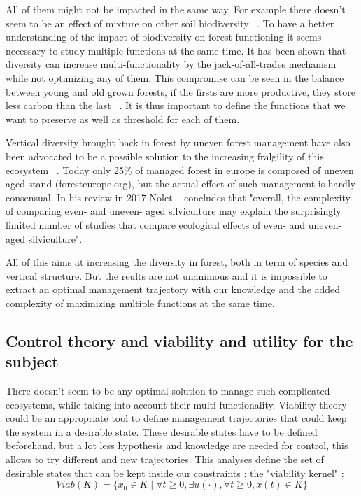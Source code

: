 \documentclass{article}
\begin{document}
All of them might not be impacted in the same way. For example there doesn't seem to be an effect of mixture on other soil biodiversity ~\autocite{korboulewskyHowTreeDiversity2016}.
To have a better understanding of the impact of biodiversity on forest functioning it seems necessary to study multiple functions at the same time. It has been shown that diversity can increase multi-functionality by the jack-of-all-trades mechanism ~\autocite{vanderplasJackofalltradesEffectsDrive2016} while not optimizing any of them. This compromise can be seen in the balance between young and old grown forests, if the firsts are more productive, they store less carbon than the last ~\autocite{caspersenSuccessionalDiversityForest2001}. It is thus important to define the functions that we want to preserve as well as threshold for each of them.

Vertical diversity brought back in forest by uneven forest management have also been advocated to be a possible solution to the increasing fralgility of this ecosystem ~\autocite{guldinRoleUnevenAgedSilviculture1996}. Today only 25\% of managed forest in europe is composed of uneven aged stand (foresteurope.org), but the actual effect of such management is hardly consensual. In his review in 2017 Nolet ~\autocite{noletComparingEffectsEven2018} concludes that "overall, the complexity	of comparing even- and uneven- aged silviculture may explain the surprisingly limited number of studies that compare ecological effects of even- and uneven- aged silviculture".

All of this aims at increasing the diversity in forest, both in term of species and vertical structure. But the reults are not unanimous and it is impossible to extract an optimal management trajectory with our knowledge and the added complexity of maximizing multiple functions at the same time.

\subsection{Control theory and viability and utility for the subject}

There doesn't seem to be any optimal solution to manage such complicated ecosystems, while taking into account their multi-functionality. Viability theory could be an appropriate tool to define management trajectories that could keep the system in a desirable state. These desirable states have to be defined beforehand, but a lot less hypothesis and knowledge are needed for control, this allows to try different and new trajectories. This analyses define the set of desirable states that can be kept inside our constraints : the "viability kernel" \autocite{rougeExtendingViabilityTheory2013} : 
\begin{equation}
    Viab(K) = \{x_0 \in K \mid \forall t \geq 0, \exists u(\cdot), \forall t \geq 0, x(t) \in K\}
\end{equation}
\end{document}
